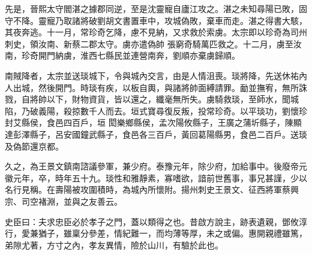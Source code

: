 \begin{pinyinscope}
 先是，晉熙太守閻湛之據郡同逆，至是沈靈寵自廬江攻之。湛之未知尋陽已敗，固守不降。靈寵乃取諸將破劉胡文書置車中，攻城偽敗，棄車而走。湛之得書大駭，其夜奔逃。十一月，常珍奇乞降，慮不見納，又求救於索虜。太宗即以珍奇為司州刺史，領汝南、新蔡二郡太守。虜亦遣偽帥
 張窮奇騎萬匹救之。十二月，虜至汝南，珍奇開門納虜，淮西七縣民並連營南奔，劉順亦棄虜歸順。



 南賊降者，太宗並送琰城下，令與城內交言，由是人情沮喪。琰將降，先送休祐內人出城，然後開門。時琰有疾，以板自輿，與諸將帥面縛請罪。勔並撫宥，無所誅戮，自將帥以下，財物資貨，皆以還之，纖毫無所失。虜騎救琰，至師水，聞城陷，乃破義陽，殺掠數千人而去。垣式寶尋復反叛，投常珍奇。以平琰功，劉懷珍封艾縣侯，食邑四百戶，垣
 閎樂鄉縣侯，孟次陽攸縣子，王廣之蒲圻縣子，陳顯達彭澤縣子，呂安國鐘武縣子，食邑各三百戶，黃回葛陽縣男，食邑二百戶。送琰及偽節還京都。



 久之，為王景文鎮南諮議參軍，兼少府。泰豫元年，除少府，加給事中。後廢帝元徽元年，卒，時年五十九。琰性和雅靜素，寡嗜欲，諳前世舊事，事兄甚謹，少以名行見稱。在壽陽被攻圍積時，為城內所懷附。揚州刺史王景文、征西將軍蔡興宗、司空褚淵，並與之友善云。



 史臣曰：夫求忠臣必於孝子之門，蓋以類得之也。昔啟方說主，跡表遺親，鄧攸淳行，愛兼猶子，雖稟分參差，情紀難一，而均薄等厚，未之或偏。惠開親禮雖篤，弟隙尤著，方寸之內，孝友異情，險於山川，有驗於此也。



\end{pinyinscope}